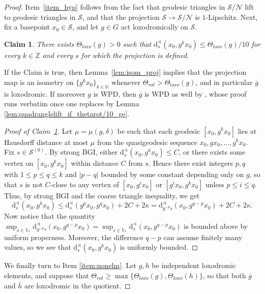 \documentclass[svgnames]{amsart}
\theoremstyle{plain}
\newtheorem{claim}[thm]{Claim}
\theoremstyle{definition}
\newenvironment{claimproof}{\renewcommand{\qedsymbol}{$\blacksquare$}\begin{proof}}{\end{proof}}
\newcommand{\ov}[1]{\overline{#1}}
\newcommand{\dist}{\mathrm{d}}
\newcommand{\N}{\mathcal{N}}
\newcommand{\calS}{\mathcal{S}}
\renewcommand{\angle}{\sphericalangle}
\begin{document}
\begin{proof}
    Item~\eqref{item_hyp} follows from the fact that geodesic triangles in $\calS/\N$ lift to geodesic triangles in $\calS$, and that the projection $\calS\to \calS/\N$ is $1$-Lipschitz. Next, fix a basepoint $x_0\in \calS$, and let $g\in G$ act loxodromically on $\calS$. 
    
    \begin{claim}\label{claim:loxo_stay_loxo}
    There exists $\Theta_{loxo}(g)>0$ such that $\dist^\angle_s(x_0,g^kx_0)\le \Theta_{loxo}(g)/10$ for every $k\in \mathbb Z$ and every $s$ for which the projection is defined. 
    \end{claim}
    If the Claim is true, then Lemma~\ref{lem:isom_proj} implies that the projection map is an isometry on $\{g^kx_0\}_{k\in \mathbb N}$ whenever $\Theta_{rot}>\Theta_{loxo}(g)$, and in particular $\ov g$ is loxodromic. If moreover $g$ is WPD, then $\ov g$ is WPD as well by \cite[Proposition 4.6]{dfdt}, whose proof runs verbatim once one replaces \cite[Proposition 4.3]{dfdt} by Lemma \ref{lem:quadranglelift_if_thetarot/10_ge}.

    \begin{claimproof}[Proof of Claim~\ref{claim:loxo_stay_loxo}]
    Let $\mu=\mu(g,\delta)$ be such that each geodesic $[x_0,g^kx_0]$ lies at Hausdorff distance at most $\mu$ from the quasigeodesic sequence $x_0 , gx_0,\ldots, g^kx_0$. Fix $s\in \calS^{(0)}$. By strong BGI, either $\dist^\angle_s(x_0, g^kx_0)\le C$, or there exists some vertex on $[x_0,g^kx_0]$ within distance $C$ from $s$. Hence there exist integers $p, q$ with $1\le p \le q \le k$ and $|p-q|$ bounded by some constant depending only on $g$, so that $s$ is not $C$-close to any vertex of $[x_0 , g^i x_0 ]$ or $[g^i x_0 , g^k x_0 ]$ unless $p \le i \le q$. Thus, by strong BGI and the coarse triangle inequality, we get $$\dist^\angle_s (x_0 , g^k x_0 ) \le \dist^\angle_s (g^px_0 , g^q x_0 ) + 2C+2\kappa=\dist^\angle_{g^{-p}s} (x_0 , g^{q-p} x_0 ) + 2C+2\kappa.$$ 
    Now notice that the quantity $\sup_{s\in \mathbb Y_*}\dist^\angle_{g^{-p}s} (x_0 , g^{q-p} x_0 )=\sup_{s\in \mathbb Y_*}\dist^\angle_{s} (x_0 , g^{q-p} x_0 )$ is bounded above by uniform properness. Moreover, the difference $q-p$ can assume finitely many values, so we see that $\dist^\angle_s (x_0 , g^k x_0 )$ is uniformly bounded.
    \end{claimproof}

    We finally turn to Item \eqref{item:nonelm}. Let $g,h$ be independent loxodromic elements, and suppose that $\Theta_{rot}\ge \max\{\Theta_{loxo}(g),\Theta_{loxo}(h)\}$, so that both $\ov g$ and $\ov h$ are loxodromic in the quotient. 


\end{proof}
\end{document}
